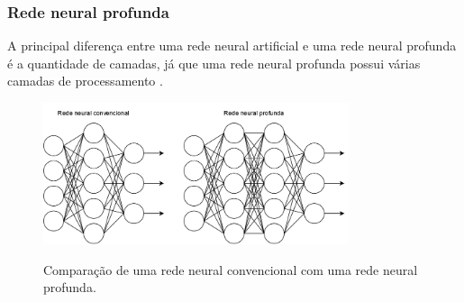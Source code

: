 \subsubsection*{Rede neural profunda}

A principal diferença entre uma rede neural artificial e uma rede neural profunda é a quantidade de camadas, já que uma rede neural profunda possui várias camadas de processamento .

\begin{figure}[ht]
	\centering
	\caption{Comparação de uma rede neural convencional com uma rede neural profunda.}
	\includegraphics[width=0.8\textwidth]{figures/redes_neurais.png}
	\label{fig:redes_neurais}
\end{figure}